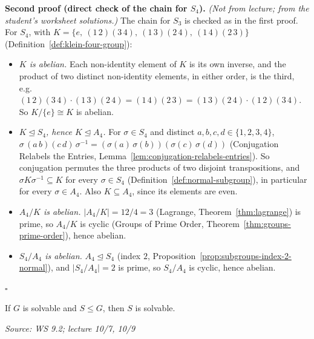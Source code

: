 \documentclass[11pt]{report}
\renewenvironment{proof}[1][Proof]{\noindent\textbf{#1.} }{\hfill$\square$\par\vspace{5pt}}
\newcommand{\srcline}[1]{\par\hfill{\footnotesize\textit{Source: #1}}}
\begin{document}
\begin{proof}[Second proof (direct check of the chain for $S_4$)]
\textit{(Not from lecture; from the student's worksheet solutions.)} The chain for $S_3$ is checked as in the first proof. For $S_4$, with $K = \{e,\ (1\,2)(3\,4),\ (1\,3)(2\,4),\ (1\,4)(2\,3)\}$ (Definition~\ref{def:klein-four-group}):
\begin{itemize}
    \item \emph{$K$ is abelian.} Each non-identity element of $K$ is its own inverse, and the product of two distinct non-identity elements, in either order, is the third, e.g.\ $(1\,2)(3\,4) \cdot (1\,3)(2\,4) = (1\,4)(2\,3) = (1\,3)(2\,4) \cdot (1\,2)(3\,4)$. So $K/\{e\} \cong K$ is abelian.
    \item \emph{$K \trianglelefteq S_4$, hence $K \trianglelefteq A_4$.} For $\sigma \in S_4$ and distinct $a, b, c, d \in \{1, 2, 3, 4\}$, $\sigma\,(a\,b)(c\,d)\,\sigma^{-1} = (\sigma(a)\,\sigma(b))(\sigma(c)\,\sigma(d))$ (Conjugation Relabels the Entries, Lemma~\ref{lem:conjugation-relabels-entries}). So conjugation permutes the three products of two disjoint transpositions, and $\sigma K \sigma^{-1} \subseteq K$ for every $\sigma \in S_4$ (Definition~\ref{def:normal-subgroup}), in particular for every $\sigma \in A_4$. Also $K \subseteq A_4$, since its elements are even.
    \item \emph{$A_4/K$ is abelian.} $|A_4/K| = 12/4 = 3$ (Lagrange, Theorem~\ref{thm:lagrange}) is prime, so $A_4/K$ is cyclic (Groups of Prime Order, Theorem~\ref{thm:groups-prime-order}), hence abelian.
    \item \emph{$S_4/A_4$ is abelian.} $A_4 \trianglelefteq S_4$ (index $2$, Proposition~\ref{prop:subgroups-index-2-normal}), and $|S_4/A_4| = 2$ is prime, so $S_4/A_4$ is cyclic, hence abelian.
\end{itemize}
\end{proof}

\begin{propbox}\label{prop:subgroups-solvable}
If $G$ is solvable and $S \leq G$, then $S$ is solvable.
\srcline{WS 9.2; lecture 10/7, 10/9}
\end{propbox}
\end{document}

